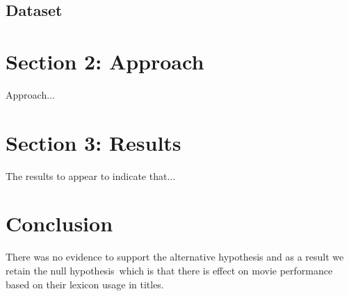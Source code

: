 \documentclass[font=10pt]{article}
\begin{document}
    \subsection{Dataset}

  \section{Section 2: Approach}
  Approach...
  \section{Section 3: Results}
  The results to appear to indicate that...
  \section{Conclusion}
  There was no evidence to support the alternative hypothesis and as a result we retain the null hypothesis\
  which is that there is effect on movie performance based on their lexicon usage in titles.
\end{document}
